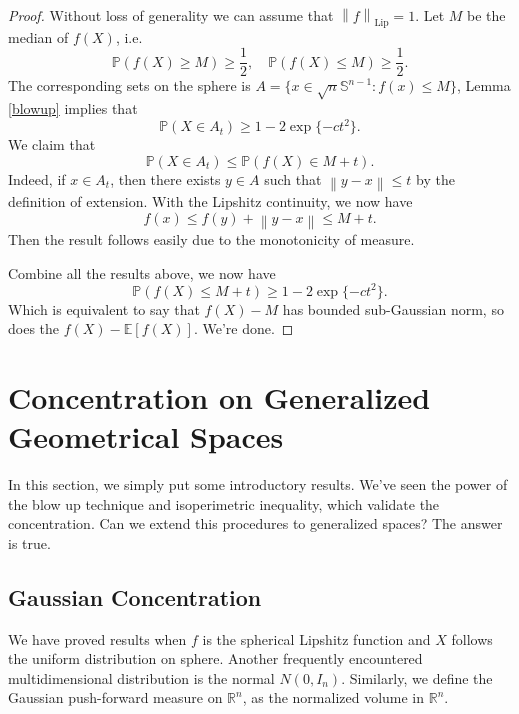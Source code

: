 \documentclass[9pt,onesided]{article}
\newcommand{\nm}[1]{\left\lVert#1\right\rVert}
\newcommand{\re}{\mathbb{R}}
\newcommand{\ex}[1]{\mathbb{E}[#1]}
\renewcommand{\ge}{\geqslant}
\renewcommand{\le}{\leqslant}
\newcommand{\s}{\mathbb{S}}
\newcommand{\p}{\mathbb{P}}
\theoremstyle{definition}
\begin{document}
\begin{proof}
    Without loss of generality we can assume that $\nm{f}_{\mathrm{Lip}}=1$. Let $M$ be the median of $f(X)$, i.e.
    \begin{equation*}
        \p(f(X)\ge M)\ge \frac{ 1}{2},\quad \p(f(X)\le M)\ge \frac{1}{2}.
    \end{equation*}
    The corresponding sets on the sphere is $A=\{x\in \sqrt{n}\s^{n-1}:f(x)\le M\}$, Lemma \ref{blowup} implies that
    \begin{equation*}
         \p(X\in A_t)\ge 1-2\exp\{-ct^2\}.
    \end{equation*}
    We claim that
    \begin{equation*}
         \p(X\in A_t)\le \p(f(X)\in M+t).
    \end{equation*}
    Indeed, if $x\in A_t$, then there exists $y\in A$ such that $\nm{y-x}\le t$ by the definition of extension. With the Lipshitz continuity, we now have
    \begin{equation*}
        f(x)\le f(y)+\nm{y-x}\le M+t.
    \end{equation*}
    Then the result follows easily due to the monotonicity of measure. 

     Combine all the results above, we now have
     \begin{equation*}
          \p(f(X)\le M+t)\ge 1-2\exp\{ -ct^2\}.
     \end{equation*}
     Which is equivalent to say that $f(X)-M$ has bounded sub-Gaussian norm, so does the $f(X)-\ex{f(X)}$. We're done.    
\end{proof}

\section{Concentration on Generalized Geometrical Spaces}

In this section, we simply put some introductory results. We've seen the power of the blow up technique and isoperimetric inequality, which validate the concentration. Can we extend this procedures to generalized spaces? The answer is true. 

\subsection{Gaussian Concentration}

We have proved results when $f$ is the spherical Lipshitz function and $X$ follows the uniform distribution on sphere. Another frequently encountered multidimensional distribution is the normal $N(0,I_n)$. Similarly, we define the Gaussian push-forward measure on $\re^n$, as the normalized volume in $\re^n$.
\end{document}
